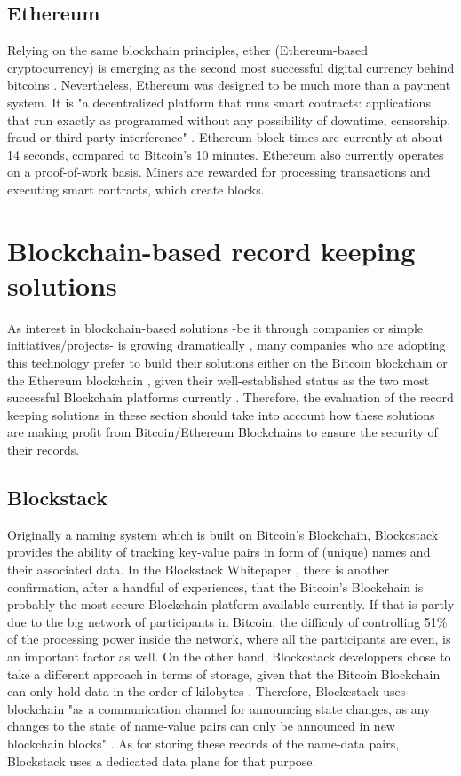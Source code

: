 \documentclass[a4paper]{article}
\begin{document}
\subsection{Ethereum}
Relying on the same blockchain principles, ether (Ethereum-based cryptocurrency) is emerging as the second most successful digital currency behind bitcoins \cite{value}. Nevertheless, Ethereum was designed to be much more than a payment system.  It is "a decentralized platform that runs smart contracts: applications that run exactly as programmed without any possibility of downtime, censorship, fraud or third party interference" \cite{ethereum}.  Ethereum block times are currently at about 14 seconds, compared to Bitcoin’s 10 minutes. Ethereum also currently operates on a proof-of-work basis. Miners are rewarded for processing transactions and executing smart contracts, which create blocks.
\section{Blockchain-based record keeping solutions}
As interest in blockchain-based solutions -be it through companies or simple initiatives/projects- is growing dramatically \cite{trends}, many companies who are adopting this technology prefer to build their solutions either on the Bitcoin blockchain or the Ethereum blockchain \cite{canada}, given their well-established status as the two most successful Blockchain platforms currently \cite{value}. Therefore, the evaluation of the record keeping solutions in these section should take into account how these solutions are making profit from Bitcoin/Ethereum Blockchains to ensure the security of their records.
\subsection{Blockstack}
Originally a naming system which is built on Bitcoin's Blockchain, Blockcstack provides the ability of tracking key-value pairs in form of (unique) names and their associated data. In the Blockstack Whitepaper \cite{bswp}, there is another confirmation, after a handful of experiences, that the Bitcoin's Blockchain is probably the most secure Blockchain platform available currently. If that is partly due to the big network of participants in Bitcoin, the difficuly of controlling 51\% of the processing power inside the network,
where all the participants are even, is an important factor as well. On the other hand, Blockcstack developpers chose to take a different approach in terms of storage, given that the Bitcoin Blockchain can only hold data in the order of kilobytes \cite{satoshi}. Therefore, Blockcstack uses blockchain "as a communication channel for announcing state changes, as any changes to the state of name-value pairs can only be announced in new blockchain blocks" \cite{bswp}. As for storing these records of the name-data pairs, Blockstack uses a dedicated data plane for that purpose.
\end{document}
